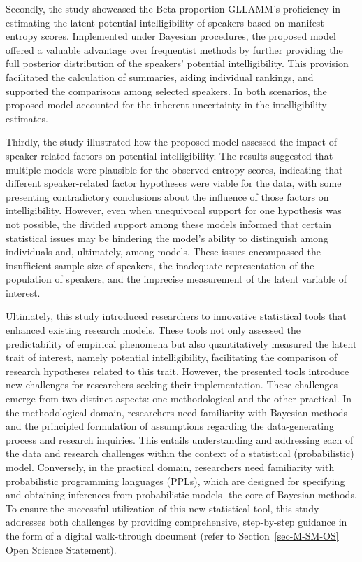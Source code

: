 \documentclass[
  authoryear,
  preprint,
  1p]{elsarticle}
\begin{document}
Secondly, the study showcased the Beta-proportion GLLAMM's proficiency
in estimating the latent potential intelligibility of speakers based on
manifest entropy scores. Implemented under Bayesian procedures, the
proposed model offered a valuable advantage over frequentist methods by
further providing the full posterior distribution of the speakers'
potential intelligibility. This provision facilitated the calculation of
summaries, aiding individual rankings, and supported the comparisons
among selected speakers. In both scenarios, the proposed model accounted
for the inherent uncertainty in the intelligibility estimates.

Thirdly, the study illustrated how the proposed model assessed the
impact of speaker-related factors on potential intelligibility. {The
results suggested that multiple models were plausible for the observed
entropy scores, indicating that different speaker-related factor
hypotheses were viable for the data, with some presenting contradictory
conclusions about the influence of those factors on intelligibility.}
However, even when unequivocal support for one hypothesis was not
possible, the divided support among these models informed that certain
statistical issues may be hindering the model's ability to distinguish
among individuals and, ultimately, among models. These issues
encompassed the insufficient sample size of speakers, the inadequate
representation of the population of speakers, and the imprecise
measurement of the latent variable of interest.

Ultimately, this study introduced researchers to innovative statistical
tools that enhanced existing research models. {These tools not only
assessed the predictability of empirical phenomena but also
quantitatively measured the latent trait of interest, namely potential
intelligibility, facilitating the comparison of research hypotheses
related to this trait.} However, the presented tools introduce new
challenges for researchers seeking their implementation. These
challenges emerge from two distinct aspects: one methodological and the
other practical. In the methodological domain, researchers need
familiarity with Bayesian methods and the principled formulation of
assumptions regarding the data-generating process and research
inquiries. This entails understanding and addressing each of the data
and research challenges within the context of a statistical
(probabilistic) model. Conversely, in the practical domain, researchers
need familiarity with probabilistic programming languages (PPLs), which
are designed for specifying and obtaining inferences from probabilistic
models -the core of Bayesian methods. To ensure the successful
utilization of this new statistical tool, this study addresses both
challenges by providing comprehensive, step-by-step guidance in the form
of a digital walk-through document (refer to Section~\ref{sec-M-SM-OS}
Open Science Statement).
\end{document}
